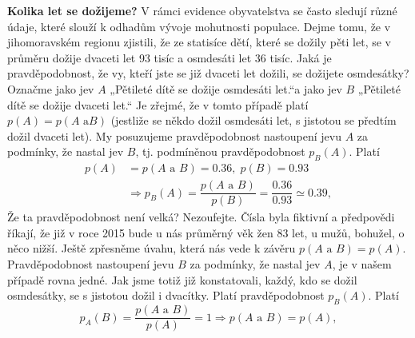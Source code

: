 \begin{mdframed}[style=mdexam]
  \begin{example}\label{mai:exam059}
    \textbf{Kolika let se dožijeme?}\newline
    V rámci evidence obyvatelstva se často sledují různé údaje, které slouží k odhadům vývoje
    mohutnosti populace. Dejme tomu, že v jihomoravském regionu zjistili, že ze statisíce dětí,
    které se dožily pěti let, se v průměru dožije dvaceti let \num{93} tisíc a osmdesáti let
    \num{36} tisíc. Jaká je pravděpodobnost, že vy, kteří jste se již dvaceti let dožili, se
    dožijete osmdesátky? Označme jako jev \(A\) „Pětileté dítě se dožije osmdesáti let.“a jako jev
    \(B\) „Pětileté dítě se dožije dvaceti let.“ Je zřejmé, že v tomto případě platí \(p(A) =
    p(A\text{ a}B)\) (jestliže se někdo dožil osmdesáti let, s jistotou se předtím dožil dvaceti
    let). My posuzujeme pravděpodobnost nastoupení jevu \(A\) za podmínky, že nastal jev \(B\), tj.
    podmíněnou pravděpodobnost \(p_B(A)\). Platí
    \begin{align*}
      p(A)   &= p(A\text{ a }B)  = \num{0.36},\; p(B) = \num{0.93}                         \\
             &\Rightarrow p_B(A) = \dfrac{p(A\text{ a }B)}{p(B)}                           
                                 = \dfrac{\num{0.36}}{\num{0.93}} \simeq \num{0.39},
    \end{align*}
    Že ta pravděpodobnost není velká? Nezoufejte. Čísla byla fiktivní a předpovědi říkají, že již v
    roce \num{2015} bude u nás průměrný věk žen \num{83} let, u mužů, bohužel, o něco nižší. Ještě
    zpřesněme úvahu, která nás vede k závěru \(p(A\text{ a }B) = p(A)\). Pravděpodobnost nastoupení
    jevu \(B\) za podmínky, že nastal jev \(A\), je v našem případě rovna jedné. Jak jsme totiž již
    konstatovali, každý, kdo se dožil osmdesátky, se s jistotou dožil i dvacítky. Platí
    pravděpodobnost \(p_B(A)\). Platí
    \begin{equation*}
      p_A(B) = \dfrac{p(A\text{ a }B)}{p(A)} = 1 \Rightarrow p(A\text{ a }B) = p(A),
    \end{equation*}
  \end{example}
\end{mdframed}